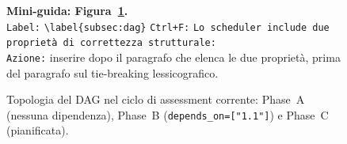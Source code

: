 \begin{figure}[ht]
  \caption{Topologia del \gls{DAG} nel ciclo di assessment corrente: Phase~A (nessuna dipendenza), Phase~B (\texttt{depends\_on=["1.1"]}) e Phase~C (pianificata).}
  \label{fig:dag-topology}
  \par\smallskip
  {\small \noindent\textbf{Mini-guida: Figura~\ref{fig:dag-topology}.}\\
    \texttt{Label:} \verb|\label{subsec:dag}| \quad
    \texttt{Ctrl+F:} \texttt{Lo scheduler include due proprietà di correttezza strutturale:}\\
    \texttt{Azione:} inserire dopo il paragrafo che elenca le due proprietà, prima del paragrafo sul tie-breaking lessicografico. }
\end{figure}

